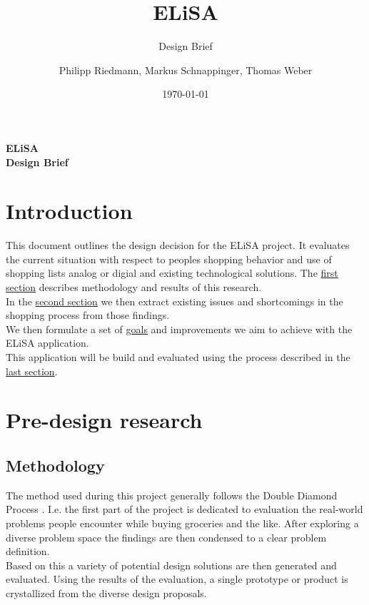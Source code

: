 \documentclass{scrartcl}
\title{ELiSA}
\subtitle{Design Brief}
\date{\today}
\author{Philipp Riedmann, Markus Schnappinger, Thomas Weber}
\begin{document}
\begin{titlepage}
   \begin{center}
      \LARGE\textbf{ELiSA}\\
      \vspace{0.5cm}
      \large\textbf{Design Brief}
   \end{center}
\end{titlepage}

\section{Introduction}
This document outlines the design decision for the ELiSA project.
It evaluates the current situation with respect to peoples shopping behavior and use of shopping lists analog or digial and existing technological solutions.
The \hyperref[sec:research]{first section} describes methodology and results of this research. \\

In the \hyperref[sec:problem]{second section} we then extract existing issues and shortcomings in the shopping process from those findings.\\

We then formulate a set of \hyperref[sec:goal]{goals} and improvements we aim to achieve with the ELiSA application.\\

This application will be build and evaluated using the process described in the \hyperref[sec:process]{last section}.

\section{Pre-design research}
\label{sec:research}
  \subsection{Methodology}
    The method used during this project generally follows the Double Diamond Process \cite{TODO}. I.e. the first part of the project is dedicated to evaluation the real-world problems people encounter while buying groceries and the like. After exploring a diverse problem space the findings are then condensed to a clear problem definition.\\
    Based on this a variety of potential design solutions are then generated and evaluated. Using the results of the evaluation, a single prototype or product is crystallized from the diverse design proposals.\\
\end{document}
